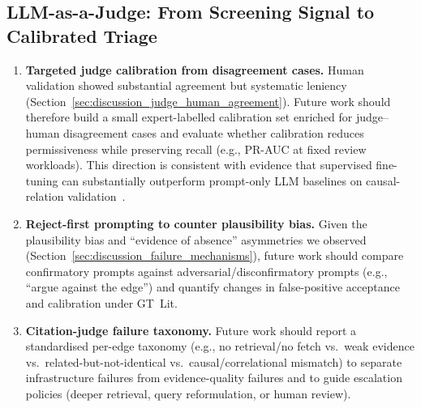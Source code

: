 \subsection{LLM-as-a-Judge: From Screening Signal to Calibrated Triage}
\begin{enumerate}[noitemsep]
    \item \textbf{Targeted judge calibration from disagreement cases.} Human validation showed substantial agreement but systematic leniency (Section~\ref{sec:discussion_judge_human_agreement}). Future work should therefore build a small expert-labelled calibration set enriched for judge--human disagreement cases and evaluate whether calibration reduces permissiveness while preserving recall (e.g., PR-AUC at fixed review workloads). This direction is consistent with evidence that supervised fine-tuning can substantially outperform prompt-only LLM baselines on causal-relation validation~\citep{susanti2024prompting}.
    \item \textbf{Reject-first prompting to counter plausibility bias.} Given the plausibility bias and ``evidence of absence'' asymmetries we observed (Section~\ref{sec:discussion_failure_mechanisms}), future work should compare confirmatory prompts against adversarial/disconfirmatory prompts (e.g., ``argue against the edge'') and quantify changes in false-positive acceptance and calibration under GT~Lit.
    \item \textbf{Citation-judge failure taxonomy.} Future work should report a standardised per-edge taxonomy (e.g., no retrieval/no fetch vs.\ weak evidence vs.\ related-but-not-identical vs.\ causal/correlational mismatch) to separate infrastructure failures from evidence-quality failures and to guide escalation policies (deeper retrieval, query reformulation, or human review).
\end{enumerate}

